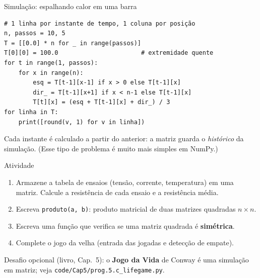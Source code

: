 \documentclass[aspectratio=169,10pt,t]{beamer}
\begin{document}
\begin{frame}[fragile]{Simulação: espalhando calor em uma barra}
\begin{lstlisting}
# 1 linha por instante de tempo, 1 coluna por posição
n, passos = 10, 5
T = [[0.0] * n for _ in range(passos)]
T[0][0] = 100.0                       # extremidade quente
for t in range(1, passos):
    for x in range(n):
        esq = T[t-1][x-1] if x > 0 else T[t-1][x]
        dir_ = T[t-1][x+1] if x < n-1 else T[t-1][x]
        T[t][x] = (esq + T[t-1][x] + dir_) / 3
for linha in T:
    print([round(v, 1) for v in linha])
\end{lstlisting}
  \small Cada instante é calculado a partir do anterior: a matriz guarda o \emph{histórico} da simulação. (Esse tipo de problema é muito mais simples em NumPy.)
\end{frame}

\begin{frame}{Atividade}
  \begin{enumerate}
    \item Armazene a tabela de ensaios (tensão, corrente, temperatura) em uma matriz. Calcule a resistência de cada ensaio e a resistência média.
    \item Escreva \texttt{produto(a, b)}: produto matricial de duas matrizes quadradas \(n\times n\).
    \item Escreva uma função que verifica se uma matriz quadrada é \textbf{simétrica}.
    \item Complete o jogo da velha (entrada das jogadas e detecção de empate).
  \end{enumerate}
  \vspace{1ex}
  \small Desafio opcional (livro, Cap.~5): o \textbf{Jogo da Vida} de Conway é uma simulação em matriz; veja \texttt{code/Cap5/prog.5.c\_lifegame.py}.
\end{frame}


\end{document}
